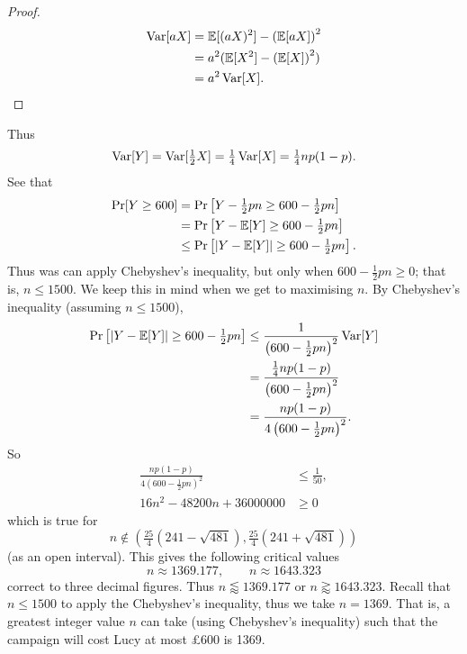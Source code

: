 \begin{solution}
    \begin{proof}
        \begin{align*}
            \operatorname{Var}[aX] & = \mathbb E[(aX)^2] - \left(\mathbb E[aX]\right)^2  \\
                     & = a^2(\mathbb E[X^2] - \left(\mathbb E[X]\right)^2) \\
                     & = a^2\operatorname{Var}[X]. \qedhere
        \end{align*}
    \end{proof}
    \vspace{0.5em}
    Thus
    \[ \operatorname{Var}[Y] = \operatorname{Var}[\tfrac12 X] = \tfrac14 \operatorname{Var}[X] = \tfrac14 np(1-p). \]
    See that
    \begin{align*}
        \Pr[Y \geq 600] & = \Pr\left[Y - \tfrac 12pn \geq 600 - \tfrac 12pn\right]                      \\
                        & = \Pr\left[Y - \mathbb E[Y] \geq 600 - \tfrac12pn\right]                   \\
                        & \leq \Pr\left[\lvert Y - \mathbb E[Y] \rvert \geq 600 - \tfrac12pn\right].
    \end{align*}
    Thus was can apply Chebyshev's inequality, but only when $600 - \tfrac12pn \geq 0$; that is, $n \leq 1500$. We keep this in mind when we get to maximising $n$. By Chebyshev's inequality (assuming $n \leq 1500$),
    \begin{align*}
        \Pr\left[\lvert Y - \mathbb E[Y] \rvert \geq 600 - \tfrac12pn\right] & \leq \frac{1}{\left(600 - \tfrac12pn\right)^2} \operatorname{Var}[Y] \\
                                                   & = \frac{\tfrac14 np(1-p)}{\left(600 - \tfrac12pn\right)^2} \\
                                                   & = \frac{np(1-p)}{4\left(600 - \tfrac12pn\right)^2}.
    \end{align*}
    So
    \begin{align*}
        \frac{np(1-p)}{4\left(600 - \tfrac12pn\right)^2} &\leq \frac{1}{50}, \\
        16n^2 - \num{48200}n + \num{36000000} &\geq 0
    \end{align*}
    which is true for 
    \[n \not\in \left(\tfrac{25}{4}(241 -\sqrt{481}), \tfrac{25}{4}(241 + \sqrt{481})\right) \] 
    (as an open interval).
    This gives the following critical values
    \[ n \approx 1369.177, \qquad n \approx 1643.323 \]
    correct to three decimal figures. Thus $n \lessapprox 1369.177$ or $n \gtrapprox 1643.323$. Recall that $n \leq 1500$ to apply the Chebyshev's inequality, thus we take $n = 1369$. That is, a greatest integer value $n$ can take (using Chebyshev's inequality) such that the campaign will cost Lucy at most £600 is \num{1369}.
\end{solution}